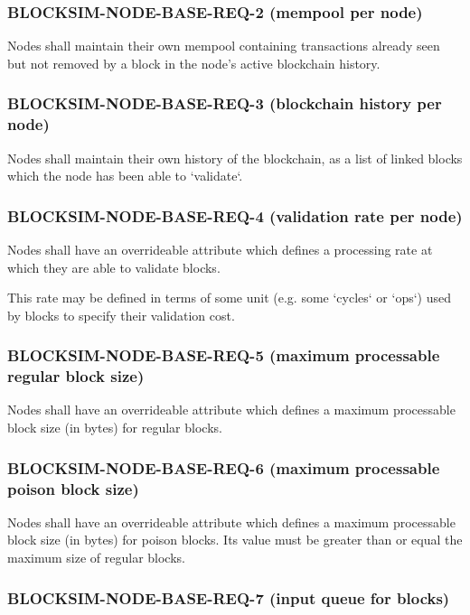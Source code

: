 \documentclass{scrreprt}
\begin{document}
\subsubsection{BLOCKSIM-NODE-BASE-REQ-2 (mempool per node)}

Nodes shall maintain their own mempool containing transactions already seen
but not removed by a block in the node's active blockchain history.


\subsubsection{BLOCKSIM-NODE-BASE-REQ-3 (blockchain history per node)}

Nodes shall maintain their own history of the blockchain, as a list of
linked blocks which the node has been able to `validate`.


\subsubsection{BLOCKSIM-NODE-BASE-REQ-4 (validation rate per node)}

Nodes shall have an overrideable attribute which defines a processing rate
at which they are able to validate blocks.

This rate may be defined in terms of some unit (e.g. some `cycles` or `ops`)
used by blocks to specify their validation cost.


\subsubsection{BLOCKSIM-NODE-BASE-REQ-5 (maximum processable regular block size)}

Nodes shall have an overrideable attribute which defines a maximum processable
block size (in bytes) for regular blocks.


\subsubsection{BLOCKSIM-NODE-BASE-REQ-6 (maximum processable poison block size)}

Nodes shall have an overrideable attribute which defines a maximum processable
block size (in bytes) for poison blocks. Its value must be greater than or
equal the maximum size of regular blocks.


\subsubsection{BLOCKSIM-NODE-BASE-REQ-7 (input queue for blocks)}
\end{document}
